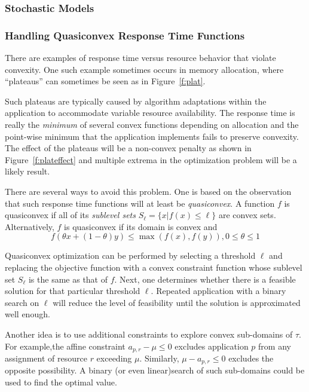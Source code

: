 \subsubsection{Stochastic Models}





\subsubsection{Handling Quasiconvex Response Time Functions}

There are examples of response time versus resource behavior that violate convexity.  One such example sometimes occurs in memory allocation, where ``plateaus'' can sometimes be seen as in Figure~\ref{f:plat}.

Such plateaus are typically caused by algorithm adaptations within the application to accommodate variable resource availability.  The response time is really the \emph{minimum} of several convex functions depending on allocation and the point-wise minimum that the application implements fails to preserve convexity.  The effect of the plateaus will be a non-convex penalty as shown in Figure~\ref{f:plateffect} and multiple extrema in the optimization problem will be a likely result.

There are several ways to avoid this problem.  One is based on the observation that such response time functions
will at least be \emph{quasiconvex}.  A function $f$ is quasiconvex if all of its \emph{sublevel sets}
$S_\ell = \{x | f(x) \leq \ell\}$ are convex sets.
Alternatively, $f$ is quasiconvex if its domain is convex and
\begin{displaymath}
f(\theta x + (1-\theta)y) \leq \max(f(x),f(y)), 0 \leq \theta \leq 1
\end{displaymath}

Quasiconvex optimization can be performed by selecting a threshold $\ell$ and replacing the objective function
with a convex constraint function whose sublevel set $S_\ell$ is the same as that of $f$.
Next, one determines whether there is a feasible solution for that particular threshold $\ell$.
Repeated application with a binary search on $\ell$ will reduce the level of feasibility
until the solution is approximated well enough.

Another idea is to use additional constraints to explore convex sub-domains of $\tau$.
For example,the affine constraint $a_{p,r} - \mu \leq 0$ excludes application $p$ from any assignment of resource $r$ exceeding $\mu$.  Similarly, $\mu - a_{p,r} \leq 0$ excludes the opposite possibility.
A binary (or even linear)search of such sub-domains could be used to find the optimal value.




